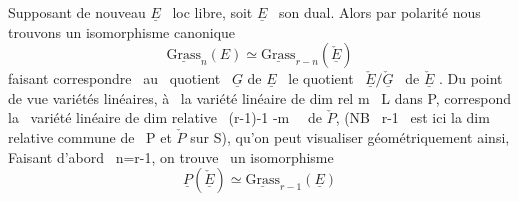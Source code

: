 Supposant de nouveau $\underline{E}$ \ loc libre, soit $\underline{E}$ \ son dual. Alors
par polarité nous trouvons un isomorphisme canonique
\[ \underline{\mathrm{Grass}}_n(E) \simeq \underline{\mathrm{Grass}}_{r-n}(\check{\underline{E}}) \]
faisant correspondre \ au \ quotient \ $\underline{G}$ de $\underline{E}$ \ le quotient \ $\check{\underline{E}}/\check{\underline{G}}$ \ de $\check{\underline{E}}$ .
Du point de vue variétés linéaires, à \ la variété linéaire de dim rel
m \ L dans P, correspond la \ variété linéaire de dim relative
 \ (r-1)-1 -m \ \ de $\check{P}$, (NB \ r-1 \ est ici la dim relative
commune de \ P et $\check{P}$ sur S), qu'on peut visualiser géométriquement ainsi,
Faisant d'abord \ n=r-1, on trouve \ un isomorphisme
\[ \underline{P}(\check{\underline{E}}) \simeq \underline{\mathrm{Grass}}_{r-1}(\underline{E}) \]

